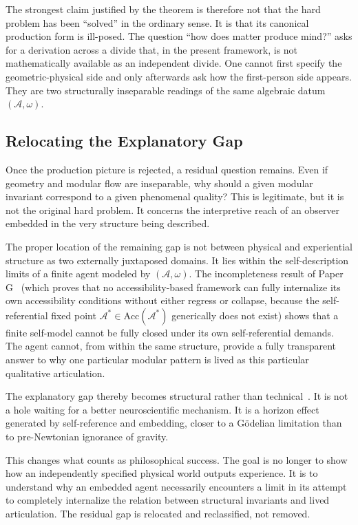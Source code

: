 \documentclass[12pt]{article}
\theoremstyle{definition}
\theoremstyle{remark}
\begin{document}
The strongest claim justified by the theorem is therefore not that the
hard problem has been ``solved'' in the ordinary sense. It is that its
canonical production form is ill-posed. The question ``how does matter
produce mind?'' asks for a derivation across a divide that, in the
present framework, is not mathematically available as an independent
divide. One cannot first specify the geometric-physical side and only
afterwards ask how the first-person side appears. They are two
structurally inseparable readings of the same algebraic datum
\((\mathcal{A},\omega)\).

\subsection{Relocating the Explanatory
Gap}\label{relocating-the-explanatory-gap}

Once the production picture is rejected, a residual question remains.
Even if geometry and modular flow are inseparable, why should a given
modular invariant correspond to a given phenomenal quality? This is
legitimate, but it is not the original hard problem. It concerns the
interpretive reach of an observer embedded in the very structure being
described.

The proper location of the remaining gap is not between physical and
experiential structure as two externally juxtaposed domains. It lies
within the self-description limits of a finite agent modeled by
\((\mathcal{A},\omega)\). The incompleteness result of Paper G~\cite{Liu2026PaperG}
(which proves that no accessibility-based framework can fully
internalize its own accessibility conditions without either regress or
collapse, because the self-referential fixed point
\(\mathcal{A}^*\in\mathrm{Acc}(\mathcal{A}^*)\) generically does not
exist) shows
that a finite self-model cannot be fully closed under its own
self-referential demands. The agent cannot, from within the same
structure, provide a fully transparent answer to why one particular
modular pattern is lived as this particular qualitative articulation.

The explanatory gap thereby becomes structural rather than
technical~\cite{Levine1983}. It
is not a hole waiting for a better neuroscientific mechanism. It is a
horizon effect generated by self-reference and embedding, closer to a
Gödelian limitation than to pre-Newtonian ignorance of gravity.

This changes what counts as philosophical success. The goal is no longer
to show how an independently specified physical world outputs
experience. It is to understand why an embedded agent necessarily
encounters a limit in its attempt to completely internalize the relation
between structural invariants and lived articulation. The residual gap
is relocated and reclassified, not removed.
\end{document}
